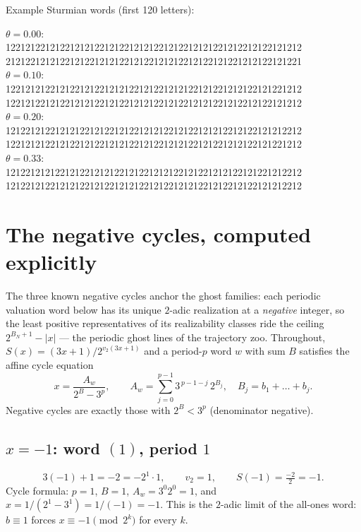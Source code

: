 \documentclass[10pt]{article}
\begin{document}
\noindent Example Sturmian words (first 120 letters):\medskip
\begingroup\ttfamily\footnotesize

$\theta=0.00$:\\
122121221212212121221212212121221212212121221212212122121212\\
212122121212212122121212212122121212212122121221212122121221\medskip\\
$\theta=0.10$:\\
122121212212122121221212122121221212122121221212122121221212\\
122121221212212121221212212121221212212121221212212122121212\medskip\\
$\theta=0.20$:\\
121221212212121221212212122121212212122121212212122121212212\\
122121212212122121221212122121221212122121221212122121221212\medskip\\
$\theta=0.33$:\\
121221212122121221212122121221212122121221212122121221212212\\
121221212212121221212212121221212212121221212212122121212212\medskip\\
\endgroup

\section{The negative cycles, computed explicitly}

The three known negative cycles anchor the ghost families: each periodic
valuation word below has its unique $2$-adic realization at a
\emph{negative} integer, so the least positive representatives of its
realizability classes ride the ceiling $2^{B_N+1}-|x|$ --- the periodic
ghost lines of the trajectory zoo. Throughout,
$S(x)=(3x+1)/2^{v_2(3x+1)}$ and a period-$p$ word $w$ with sum $B$
satisfies the affine cycle equation
\[
x=\frac{A_w}{2^{B}-3^{p}},\qquad
A_w=\sum_{j=0}^{p-1}3^{\,p-1-j}\,2^{B_j},\quad B_j=b_1+\dots+b_j .
\]
Negative cycles are exactly those with $2^B<3^p$ (denominator negative).

\subsection*{$x=-1$: word $(1)$, period $1$}
\[
3(-1)+1=-2=-2^{1}\cdot1,\qquad v_2=1,\qquad S(-1)=\tfrac{-2}{2}=-1 .
\]
Cycle formula: $p=1$, $B=1$, $A_w=3^{0}2^{0}=1$, and
$x=1/(2^{1}-3^{1})=1/(-1)=-1$. This is the $2$-adic limit of the all-ones
word: $b\equiv1$ forces $x\equiv-1 \pmod{2^k}$ for every $k$.
\end{document}
